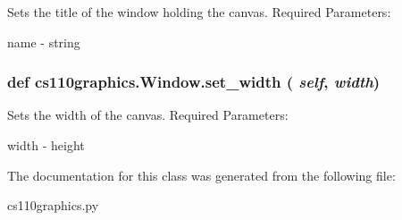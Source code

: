 Sets the title of the window holding the canvas. Required Parameters:
\begin{DoxyItemize}
\item name -\/ string 
\end{DoxyItemize}\hypertarget{classcs110graphics_1_1Window_a55036373bfb4437eb4368a39fedb8722}{
\subsubsection[{set\_\-width}]{\setlength{\rightskip}{0pt plus 5cm}def cs110graphics.Window.set\_\-width ( {\em self}, \/   {\em width})}}
\label{classcs110graphics_1_1Window_a55036373bfb4437eb4368a39fedb8722}


Sets the width of the canvas. Required Parameters:
\begin{DoxyItemize}
\item width -\/ height 
\end{DoxyItemize}

The documentation for this class was generated from the following file:\begin{DoxyCompactItemize}
\item 
cs110graphics.py\end{DoxyCompactItemize}
